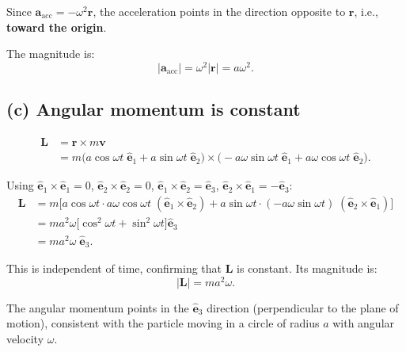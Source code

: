 \documentclass[12pt]{article}
\newcommand{\vect}[1]{\mathbf{#1}}
\newcommand{\ehat}[1]{\hat{\vect{e}}_{#1}}
\begin{document}
Since $\vect{a}_{\text{acc}} = -\omega^2 \vect{r}$, the acceleration points in the direction opposite to $\vect{r}$, i.e., \textbf{toward the origin}.

The magnitude is:
\[
|\vect{a}_{\text{acc}}| = \omega^2 |\vect{r}| = \boxed{a\omega^2}.
\]

\subsection*{(c) Angular momentum is constant}

\begin{align}
\vect{L} &= \vect{r} \times m\vect{v} \\
&= m \bigl( a\cos\omega t \; \ehat{1} + a\sin\omega t \; \ehat{2} \bigr) \times \bigl( -a\omega\sin\omega t \; \ehat{1} + a\omega\cos\omega t \; \ehat{2} \bigr).
\end{align}

Using $\ehat{1} \times \ehat{1} = 0$, $\ehat{2} \times \ehat{2} = 0$, $\ehat{1} \times \ehat{2} = \ehat{3}$, $\ehat{2} \times \ehat{1} = -\ehat{3}$:
\begin{align}
\vect{L} &= m \bigl[ a\cos\omega t \cdot a\omega\cos\omega t \;(\ehat{1}\times\ehat{2}) + a\sin\omega t \cdot (-a\omega\sin\omega t) \;(\ehat{2}\times\ehat{1}) \bigr] \\
&= m a^2\omega \bigl[ \cos^2\omega t + \sin^2\omega t \bigr] \ehat{3} \\
&= m a^2 \omega \; \ehat{3}.
\end{align}

This is independent of time, confirming that $\vect{L}$ is constant. Its magnitude is:
\[
\boxed{|\vect{L}| = m a^2 \omega}.
\]

The angular momentum points in the $\ehat{3}$ direction (perpendicular to the plane of motion), consistent with the particle moving in a circle of radius $a$ with angular velocity $\omega$.
\end{document}
